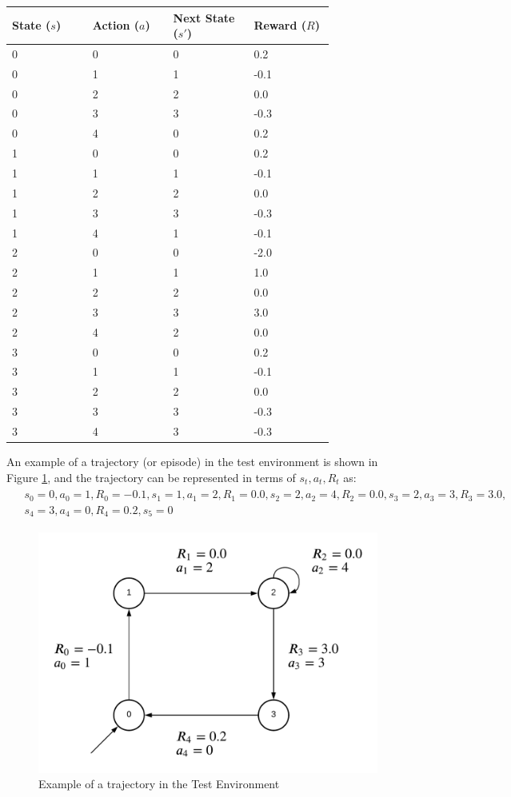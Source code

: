 \begin{center}
	\begin{tabular}{ | p{0.2\linewidth} | p{0.2\linewidth} | p{0.2\linewidth} | p{0.2\linewidth} |}
		\hline
		\textbf{State ($s$)} & \textbf{Action ($a$)} & \textbf{Next State ($s'$)} & \textbf{Reward ($R$)} \\ \hline
		0 & 0 & 0 & 0.2    \\ \hline
		0 & 1 & 1 & -0.1   \\ \hline
		0 & 2 & 2 & 0.0 \\ \hline
		0 & 3 & 3 & -0.3 \\ \hline
		0 & 4 & 0 & 0.2 \\ \hline
		1 & 0 & 0 & 0.2    \\ \hline
		1 & 1 & 1 & -0.1   \\ \hline
		1 & 2 & 2 & 0.0 \\ \hline
		1 & 3 & 3 & -0.3 \\ \hline
		1 & 4 & 1 & -0.1 \\ \hline
		2 & 0 & 0 & -2.0    \\ \hline
		2 & 1 & 1 & 1.0   \\ \hline
		2 & 2 & 2 & 0.0 \\ \hline
		2 & 3 & 3 & 3.0 \\ \hline
		2 & 4 & 2 & 0.0 \\ \hline
		3 & 0 & 0 & 0.2    \\ \hline
		3 & 1 & 1 & -0.1   \\ \hline
		3 & 2 & 2 & 0.0 \\ \hline
		3 & 3 & 3 & -0.3 \\ \hline
		3 & 4 & 3 & -0.3 \\ \hline    
	\end{tabular}
	\label{table:test_spec_2}
\end{center}

\clearpage
An example of a trajectory (or episode) in the test environment is shown in Figure \ref{fig:test_env}, and the trajectory can be represented in terms of $s_t, a_t, R_t$ as: 
\begin{align*}
\begin{split}
& s_0 = 0, a_0=1, R_0 = -0.1, s_1=1, a_1=2, R_1 = 0.0, s_2=2, a_2=4, R_2 = 0.0, s_3=2, a_3=3, R_3  = 3.0, \\
& s_4=3, a_4=0, R_4 = 0.2, s_5=0
\end{split}
\end{align*}

\begin{figure}[H]
  \centering
  \includegraphics[width=.45\linewidth]{images/test_env.png}
  \caption{Example of a trajectory in the Test Environment}
  \label{fig:test_env}
\end{figure}

\begin{enumerate}[(a)]

	

\end{enumerate}